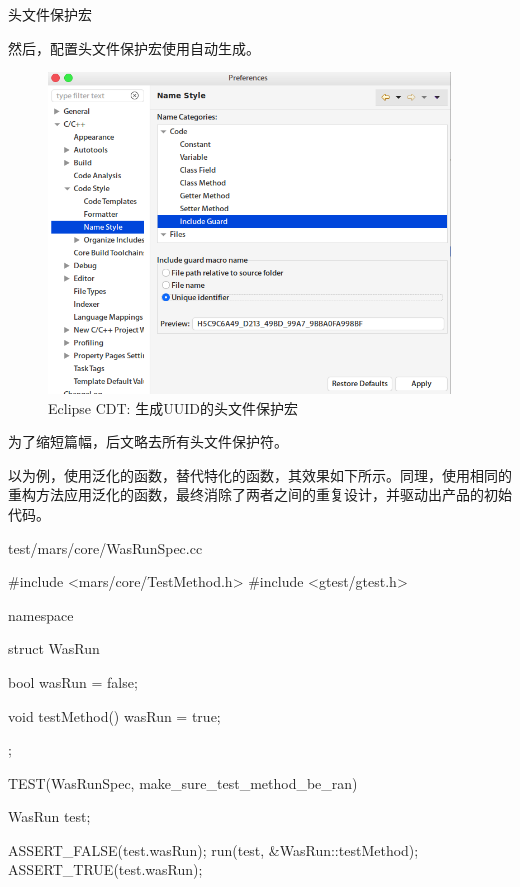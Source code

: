 \begin{content}
\begin{episode}{头文件保护宏}
\begin{content}
然后，配置头文件保护宏使用自动生成。

\begin{figure}[H]
\centering
\includegraphics[width=0.95\textwidth]{figures/xunit/eclipse-include-guard.png}
\caption{Eclipse CDT: 生成UUID的头文件保护宏}
 \label{fig:eclipse-include-guard}
\end{figure}

为了缩短篇幅，后文略去所有头文件保护符。

\end{content}
\end{episode}

以为例，使用泛化的函数，替代特化的函数，其效果如下所示。同理，使用相同的重构方法应用泛化的函数，最终消除了两者之间的重复设计，并驱动出产品的初始代码。

\begin{nodiff}{test/mars/core/WasRunSpec.cc}
\begin{c++}
#include <mars/core/TestMethod.h>
#include <gtest/gtest.h>

namespace {
  struct WasRun {
    bool wasRun = false;

    void testMethod() {
      wasRun = true;
    }
  };
}

TEST(WasRunSpec, make_sure_test_method_be_ran) {
  WasRun test;

  ASSERT_FALSE(test.wasRun);
  run(test, &WasRun::testMethod);
  ASSERT_TRUE(test.wasRun);
}
\end{c++}
\end{nodiff}


\end{content}
